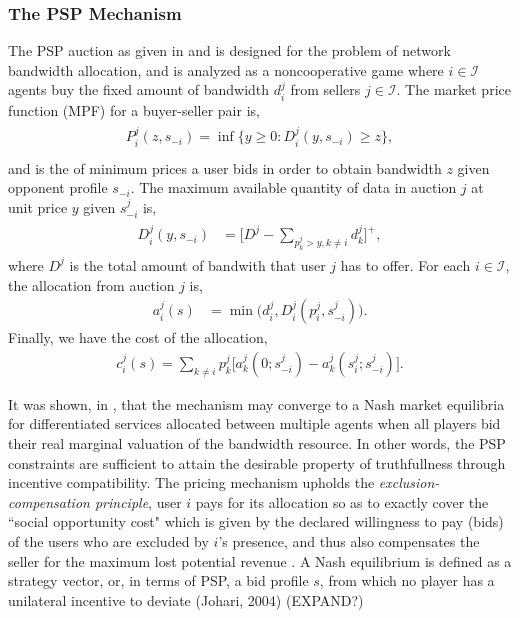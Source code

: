 \documentclass[sigconf, anonymous]{acmart}
\newcommand{\mcI}{\mathcal{I}}
\theoremstyle{definition}
\begin{document}
\subsubsection{The PSP Mechanism}\label{mechanism}
The PSP auction as given in \cite{lazar} and \cite{semret} is designed for the
problem of network bandwidth allocation, and is analyzed as a noncooperative
game where $i\in\mcI$ agents buy the
fixed amount of bandwidth $d_i^j$ from sellers $j\in\mcI$.
The market price function (MPF) for a buyer-seller pair is,
\begin{align}\label{dataprice}
\begin{split}
    P_i^j(z, s_{-i})= \inf\bigg\lbrace y\ge 0 : D_i^j(y, s_{-i}) \ge z \bigg\rbrace,\\
\end{split}
\end{align}
and is the of minimum prices a user bids in
order to obtain bandwidth $z$ given opponent profile $s_{-i}$. 
The maximum available quantity of data in auction
$j$ at unit price $y$ given $s_{-i}^j$ is,
\begin{align}\label{datapriceinverse}
\begin{split}
    D_i^j(y, s_{-i}) &= \bigg[ D^j - \sum_{p_k^j>y,k\ne i} d_k^j  \bigg]^+,
\end{split}
\end{align}
where $D^j$ is the total amount of bandwith that user $j$ has to offer.
For each $i \in \mcI$, the allocation from auction $j$ is,
\begin{align}\label{dataallocation}
    a_i^j(s) &= \min\bigg( d_i^j, 
    D_i^j(p_i^j,s_{-i}^j)\bigg).
\end{align}
Finally, we have the cost of the allocation,
\begin{align}\label{datacost}
    c_i^j(s) = \displaystyle\sum_{k\ne i} 
p_k^j \big[a_k^j(0; s_{-i}^j)
    -a_k^j(s_i^j;s_{-i}^j)\big].
\end{align}

It was shown, in \cite{lazar}, that the mechanism may converge to a Nash market
equilibria for differentiated services
allocated between multiple agents when all players bid their real marginal valuation
of the bandwidth resource. In other words, the PSP constraints are
sufficient to attain the desirable property of truthfullness through incentive
compatibility. The pricing mechanism upholds the \emph{exclusion-compensation
principle}, user $i$
pays for its allocation so as to exactly cover the ``social opportunity cost"
which is given by the declared willingness to pay (bids) of the users who are
excluded by $i$'s presence, and thus also compensates the seller for the maximum lost potential
revenue \cite{lazar}.
{
A Nash equilibrium is defined as a strategy vector, or, in terms of PSP, a bid
profile $s$,
from which no player has a unilateral incentive to deviate (Johari, 2004)
(EXPAND?)
}\\
\end{document}
